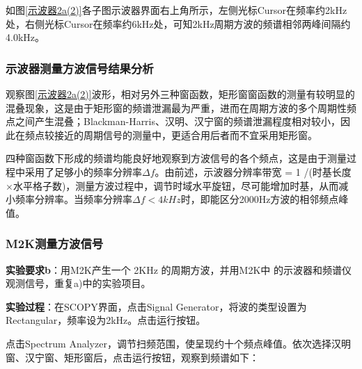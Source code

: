 \documentclass[12pt]{article}
\begin{document}
如图\ref{示波器2a(2)}各子图示波器界面右上角所示，左侧光标Cursor在频率约2kHz处，右侧光标Cursor在频率约6kHz处，可知2kHz周期方波的频谱相邻两峰间隔约4.0kHz。

\subsubsection{示波器测量方波信号结果分析}
观察图\ref{示波器2a(2)}波形，相对另外三种窗函数，矩形窗窗函数的测量有较明显的混叠现象，这是由于矩形窗的频谱泄漏最为严重，进而在周期方波的多个周期性频点之间产生混叠；Blackman-Harris、汉明、汉宁窗的频谱泄漏程度相对较小，因此在频点较接近的周期信号的测量中，更适合用后者而不宜采用矩形窗。

四种窗函数下形成的频谱均能良好地观察到方波信号的各个频点，这是由于测量过程中采用了足够小的频率分辨率$\Delta f$。由前述，示波器分辨率带宽 = 1 /(时基长度$\times$水平格子数)，测量方波过程中，调节时域水平旋钮，尽可能增加时基，从而减小频率分辨率。当频率分辨率$\Delta f<4k Hz$时，即能区分2000Hz方波的相邻频点峰值。
\subsubsection{M2K测量方波信号}
\textbf{实验要求b}：用M2K产生一个 2KHz 的周期方波，并用M2K中
的示波器和频谱仪观测信号，重复a)中的实验项目。

\textbf{实验过程}：在SCOPY界面，点击Signal Generator，将波的类型设置为Rectangular，频率设为2kHz。点击运行按钮。

点击Spectrum Analyzer，调节扫频范围，使呈现约十个频点峰值。依次选择汉明窗、汉宁窗、矩形窗后，点击运行按钮，观察到频谱如下：
\end{document}
